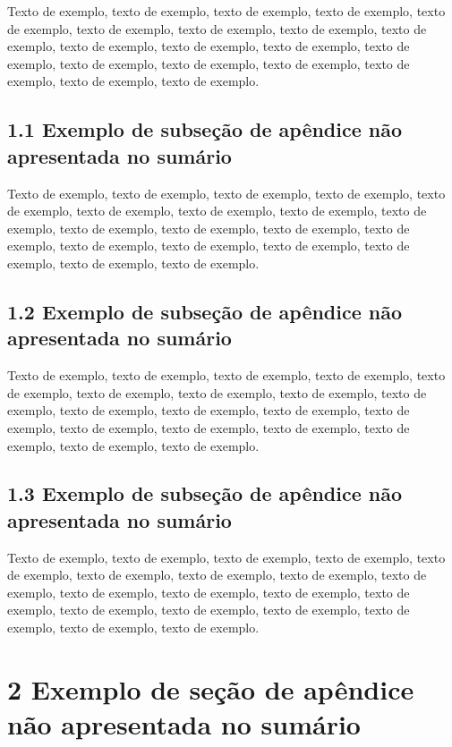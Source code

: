 \documentclass[
	12pt,				%
	oneside,			%
	a4paper,			%
	english,			%
	brazil				%
	]{abntex2ppgsi}
\begin{document}
\begin{apendicesenv}
Texto de exemplo, texto de exemplo, texto de exemplo, texto de exemplo, texto de exemplo, texto de exemplo, texto de exemplo, texto de exemplo, texto de exemplo, texto de exemplo, texto de exemplo, texto de exemplo, texto de exemplo, texto de exemplo, texto de exemplo, texto de exemplo, texto de exemplo, texto de exemplo, texto de exemplo.

\subsection*{1.1 Exemplo de subseção de apêndice não apresentada no sumário}

Texto de exemplo, texto de exemplo, texto de exemplo, texto de exemplo, texto de exemplo, texto de exemplo, texto de exemplo, texto de exemplo, texto de exemplo, texto de exemplo, texto de exemplo, texto de exemplo, texto de exemplo, texto de exemplo, texto de exemplo, texto de exemplo, texto de exemplo, texto de exemplo, texto de exemplo.

\subsection*{1.2 Exemplo de subseção de apêndice não apresentada no sumário}

Texto de exemplo, texto de exemplo, texto de exemplo, texto de exemplo, texto de exemplo, texto de exemplo, texto de exemplo, texto de exemplo, texto de exemplo, texto de exemplo, texto de exemplo, texto de exemplo, texto de exemplo, texto de exemplo, texto de exemplo, texto de exemplo, texto de exemplo, texto de exemplo, texto de exemplo.

\subsection*{1.3 Exemplo de subseção de apêndice não apresentada no sumário}

Texto de exemplo, texto de exemplo, texto de exemplo, texto de exemplo, texto de exemplo, texto de exemplo, texto de exemplo, texto de exemplo, texto de exemplo, texto de exemplo, texto de exemplo, texto de exemplo, texto de exemplo, texto de exemplo, texto de exemplo, texto de exemplo, texto de exemplo, texto de exemplo, texto de exemplo.

\section*{2 Exemplo de seção de apêndice não apresentada no sumário}


\end{apendicesenv}
\end{document}
